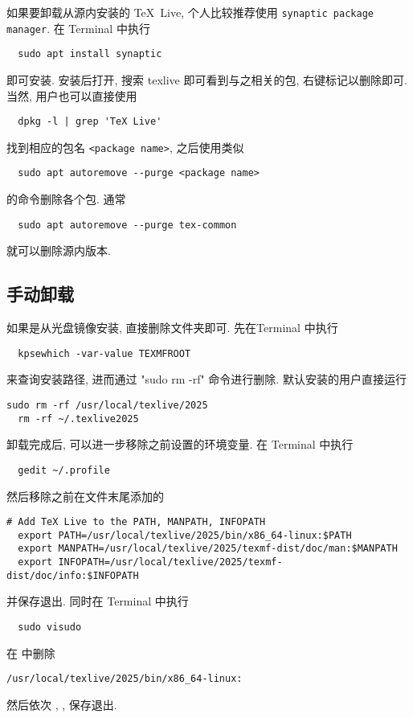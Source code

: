 如果要卸载从源内安装的 \TeX~Live, 个人比较推荐使用 \texttt{synaptic package manager}.
在 \textsf{Terminal} 中执行
\begin{lstlisting}
  sudo apt install synaptic
\end{lstlisting}
即可安装.
安装后打开, 搜索 \textsf{texlive} 即可看到与之相关的包, 右键标记以删除即可.
当然, 用户也可以直接使用
\begin{lstlisting}
  dpkg -l | grep 'TeX Live'
\end{lstlisting}
找到相应的包名 \texttt{<package name>}, 之后使用类似
\begin{lstlisting}
  sudo apt autoremove --purge <package name>
\end{lstlisting}
的命令删除各个包.
通常
\begin{lstlisting}
  sudo apt autoremove --purge tex-common
\end{lstlisting}
就可以删除源内版本.

\subsection{手动卸载}

如果是从光盘镜像安装,
直接删除文件夹即可.
先在\textsf{Terminal} 中执行
\begin{lstlisting}
  kpsewhich -var-value TEXMFROOT
\end{lstlisting}
来查询安装路径,
进而通过 "sudo rm -rf" 命令进行删除.
默认安装的用户直接运行
\begin{lstlisting}[deletekeywords = local]
  sudo rm -rf /usr/local/texlive/2025
  rm -rf ~/.texlive2025
\end{lstlisting}
卸载完成后, 可以进一步移除之前设置的环境变量.
在 \textsf{Terminal} 中执行
\begin{lstlisting}
  gedit ~/.profile
\end{lstlisting}
然后移除之前在文件末尾添加的
\begin{lstlisting}[deletekeywords = local]
  # Add TeX Live to the PATH, MANPATH, INFOPATH
  export PATH=/usr/local/texlive/2025/bin/x86_64-linux:$PATH
  export MANPATH=/usr/local/texlive/2025/texmf-dist/doc/man:$MANPATH
  export INFOPATH=/usr/local/texlive/2025/texmf-dist/doc/info:$INFOPATH
\end{lstlisting}
并保存退出.
同时在 \textsf{Terminal} 中执行
\begin{lstlisting}
  sudo visudo
\end{lstlisting}
在  中删除
\begin{lstlisting}[deletekeywords = local]
  /usr/local/texlive/2025/bin/x86_64-linux:
\end{lstlisting}
然后依次 , , \keys{\enter} 保存退出.

